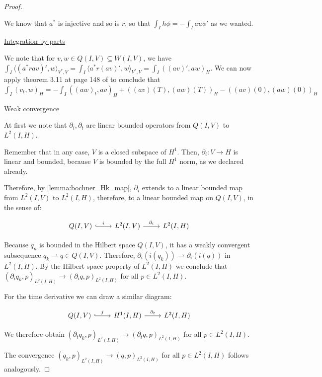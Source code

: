 \documentclass[english,a4paper,12pt,oneside]{scrbook}
\theoremstyle{break}
\newenvironment{mproof}[1][\proofname]{%
  \begin{proof}[#1]$ $\par\nobreak\ignorespaces
}{%
  \end{proof}
}
\renewcommand*{\proofname}{Proof}
\theoremstyle{remark}
\newcommand{\weakc}{\rightharpoonup}
\begin{document}
\begin{mproof}
We know that $a^*$ is injective and so is $r$, so that $ \int_I h \phi  = -\int_I au \phi'$ as we wanted.

\underline{Integration by parts}

We note that for $v,w \in Q(I,V)\subseteq W(I,V)$, we have $\int_I \langle (a^*ra v)', w\rangle_{V^*,V} = \int_I \langle a^*r(a v)', w\rangle_{V^*,V} = \int_I((a v)', aw)_H$. We can now apply theorem 3.11 at page 148 of \cite{trol} to conclude that  $\int_I(v_t,w)_H = -\int_I((aw)_t,av)_H +((av)(T),(aw)(T))_H-((av)(0),(aw)(0))_H$

\underline{Weak convergence}

At first we note that $\partial_i, \partial_t$ are linear bounded operators from $Q(I,V)$ to $L^2(I,H)$.

Remember that in any case, $V$ is a closed subspace of $H^1$. Then, $\partial_i : V\rightarrow H$ is linear and bounded, because $V$ is bounded by the full $H^1$ norm, as we declared already.

Therefore, by \cref{lemma:bochner_Hk_map}, $\partial_i$ extends to a linear bounded map from $L^2(I,V)$ to $L^2(I,H)$, therefore, to a linear bounded map on $Q(I,V)	$, in the sense of:

\[\begin{tikzcd}
	{Q(I,V)} & {L^2(I,V)} & {L^2(I,H)}
	\arrow["i", hook, from=1-1, to=1-2]
	\arrow["{\partial_i}", from=1-2, to=1-3]
\end{tikzcd}\]

Because $q_n$ is bounded in the Hilbert space $Q(I,V)$, it has a weakly convergent subsequence $q_k\weakc q \in Q(I,V)$. Therefore, $\partial_i (i(q_k))\weakc \partial_i (i(q))$ in $L^2(I,H)$. By the Hilbert space property of $L^2(I,H)$ we conclude that $(\partial_i q_k,p)_{L^2(I,H)}\rightarrow (\partial_i q,p)_{L^2(I,H)}$ for all $p \in L^2(I,H)$.

For the time derivative we can draw a similar diagram:

\[\begin{tikzcd}
	{Q(I,V)} & {H^1(I,H)} & {L^2(I,H)}
	\arrow["j", hook, from=1-1, to=1-2]
	\arrow["{\partial_t}", from=1-2, to=1-3]
\end{tikzcd}\]

We therefore obtain $(\partial_t q_k,p)_{L^2(I,H)}\rightarrow (\partial_t q,p)_{L^2(I,H)}$ for all $p \in L^2(I,H)$.

The convergence $(q_k,p)_{L^2(I,H)}\rightarrow (q,p)_{L^2(I,H)}$ for all $p \in L^2(I,H)$ follows analogously.

\end{mproof}
\end{document}
